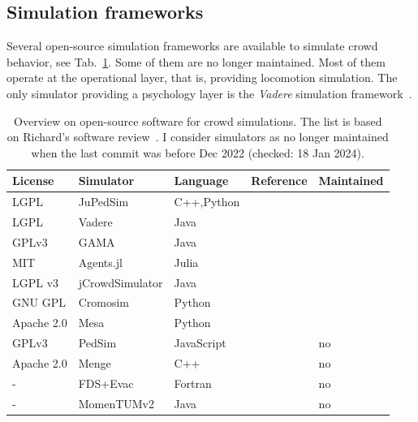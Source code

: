 \subsection{Simulation frameworks}
\label{sec:crowdssimframeworks}

Several open-source simulation frameworks are available to simulate crowd behavior, see Tab.~\ref{tab:overviewcrowdsimulators}. Some of them are no longer maintained. Most of them operate at the operational layer, that is, providing locomotion simulation. The only simulator providing a psychology layer is the \textit{Vadere} simulation framework~\cite{kleinmeier-2021-cdyn}.



\begin{table}[hbt!]
\begin{footnotesize}

\begin{tabular}{p{2.7cm}p{3.3cm}p{2.5cm}p{1.8cm}p{1.8cm}}
\hline
\textbf{License} & \textbf{ Simulator} & \textbf{Language} & Reference & Maintained \\
\hline
LGPL & JuPedSim & C++,Python  &\cite{chraibi-2016-cs}\\
LGPL & Vadere & Java & \cite{kleinmeier-2019-cdyn}\\
GPLv3 & GAMA & Java & \cite{taillandier-2017-cdyn}\\
MIT & Agents.jl & Julia & \cite{datseris-2022-cdyn}\\
LGPL v3 & jCrowdSimulator & Java & \cite{meinert-2019-cdyn}  \\
GNU GPL & Cromosim &  Python & \cite{maury-2019-cdyn}  \\
Apache 2.0  & Mesa & Python & \cite{masad-2015-cdyn}\\
\hline
GPLv3 & PedSim & JavaScript & \cite{gloor-2005-cdyn}  & no \\
Apache 2.0 &  Menge & C++ & \cite{curtis-2016-cdyn} & no \\
- & FDS+Evac  & Fortran & \cite{korhonen-2007-cdyn} & no \\
- & MomenTUMv2 & Java & \cite{kielar-2016b-cdyn} &  no \\
 \hline

\end{tabular}
\end{footnotesize}
\caption[]{Overview on open-source software for crowd simulations. The list is based on Richard's software review~\cite{richards-2020-cdyn}. I consider simulators as no longer maintained when the last commit was before Dec 2022 (checked: 18 Jan 2024). }
\label{tab:overviewcrowdsimulators}
\end{table}



